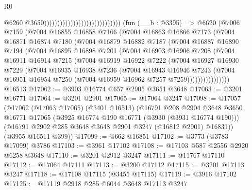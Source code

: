 \begin{lexlean}{R0}
\begin{coremodule}
                                                              @6260
                                                              @3650)))))))))))))))))))))))))))))
    (fun (__b : @3395) =>
    @6620
      (@7006
        @7159
        (@7004
          @16855
          @16858
          @7166
          (@7004
            @16863
            @16866
            @7173
            (@7004
              @16871
              @16874
              @7180
              (@7004
                @16879
                @16882
                @7187
                (@7004
                  @16887
                  @16890
                  @7194
                  (@7004
                    @16895
                    @16898
                    @7201
                    (@7004
                      @16903
                      @16906
                      @7208
                      (@7004
                        @16911
                        @16914
                        @7215
                        (@7004
                          @16919
                          @16922
                          @7222
                          (@7004
                            @16927
                            @16930
                            @7229
                            (@7004
                              @16935
                              @16938
                              @7236
                              (@7004
                                @16943
                                @16946
                                @7243
                                (@7004
                                  @16951
                                  @16954
                                  @7250
                                  (@7004 @16959 @16962 @7257 @7259))))))))))))))))
    @16513
@17062 := @3903 @16774 @657 @2905 @3651 @3648
@17063 := @3201 @16771
@17064 := @3201 @2901
@17065 := @17064 @3247
@17098 := @17057
    (@17062
      (@17063 @17065)
      (@3401 @16513)
      (@16791
        @208
        @2904
        @3648
        @3650
        @16771
        @17065
        (@3925 @16774 @190 @16771 (@3930 (@3931 @16774 @190)))
        (@16791 @2902 @285 @3648 @3648 @2901 @3247 (@16812 @2901) @16831))
      (@3955 @16511 @399))
@17099 := @662 @16851
@17102 := @3773 (@3783 @17099) @3786
@17103 := @3961 @17102
@17108 := @17103 @587 @2556 @2920 @6258 @3648
@17110 := @3201 @2912 @3247
@17111 := @11767 @17110
@17112 := @17064 @17111
@17113 := @3200 @17112
@17115 := @3201 @17113 @3247
@17118 := @17108 @17115 (@3455 @17115)
@17119 := @3916 @17102
@17125 := @17119 @2918 @285 @6044 @3648 @17113 @3247

\end{coremodule}
\end{lexlean}

